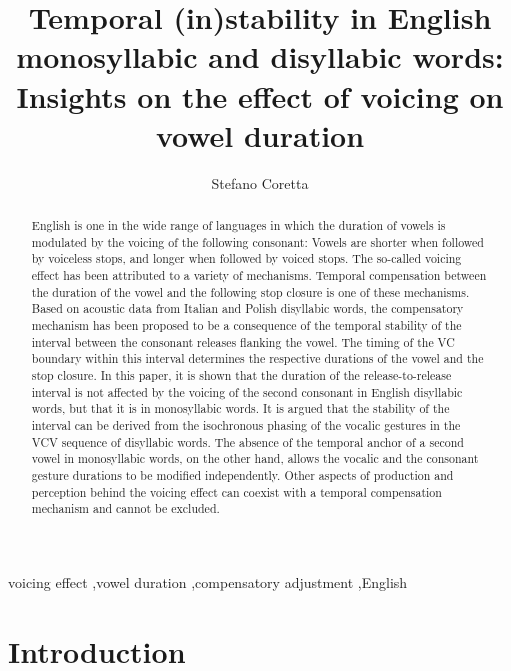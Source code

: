 \documentclass[
  12pt,
  a4paper,
  authoryear, 5p]{elsarticle}
\date{}
\begin{document}
\begin{frontmatter}

\title{Temporal (in)stability in English monosyllabic and disyllabic words: Insights on the effect of voicing on vowel duration}

\author[mcr]{Stefano Coretta}
\address[mcr]{University of Manchester, Linguistics and English Language, School of Arts, Languages and Cultures, Oxford Road, Manchester, M13 9PL, UK}

\begin{abstract}
English is one in the wide range of languages in which the duration of vowels is modulated by the voicing of the following consonant: Vowels are shorter when followed by voiceless stops, and longer when followed by voiced stops.
The so-called voicing effect has been attributed to a variety of mechanisms.
Temporal compensation between the duration of the vowel and the following stop closure is one of these mechanisms.
Based on acoustic data from Italian and Polish disyllabic words, the compensatory mechanism has been proposed to be a consequence of the temporal stability of the interval between the consonant releases flanking the vowel.
The timing of the VC boundary within this interval determines the respective durations of the vowel and the stop closure.
In this paper, it is shown that the duration of the release-to-release interval is not affected by the voicing of the second consonant in English disyllabic words, but that it is in monosyllabic words.
It is argued that the stability of the interval can be derived from the isochronous phasing of the vocalic gestures in the VCV sequence of disyllabic words.
The absence of the temporal anchor of a second vowel in monosyllabic words, on the other hand, allows the vocalic and the consonant gesture durations to be modified independently.
Other aspects of production and perception behind the voicing effect can coexist with a temporal compensation mechanism and cannot be excluded.
\end{abstract}

\begin{keyword}
voicing effect \sep vowel duration \sep compensatory adjustment \sep English
\end{keyword}

\end{frontmatter}

\hypertarget{introduction}{%
\section{Introduction}\label{introduction}}
\end{document}
